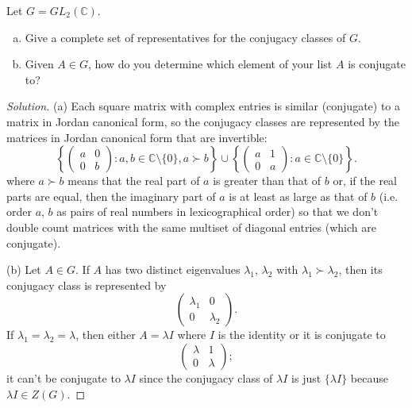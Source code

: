 \documentclass[10pt]{article}
\providecommand{\CC}{\mathbb C}
\providecommand{\ii}{\item}
\newenvironment{soln}{\begin{proof}[Solution]}{\end{proof}}
\begin{document}
\begin{problem}
    Let $G = GL_2(\CC)$.
    \begin{enumerate}[(a)]
        \ii Give a complete set of representatives for
	the conjugacy classes of $G$.
	\ii Given $A\in G$, how do you determine
	which element of your list $A$ is conjugate to?
    \end{enumerate}
\end{problem}

\begin{soln}
    (a) Each square matrix with complex entries
    is similar (conjugate) to a matrix in Jordan canonical form, so
    the conjugacy classes are represented by the matrices
    in Jordan canonical form that are invertible:
    \begin{equation*}
	\left\{ \begin{pmatrix}
		a&0\\0&b
	\end{pmatrix} : a,b\in\CC\setminus\{0\}, a\succ b\right\}\cup
	\left\{ \begin{pmatrix}
		a&1\\0&a
	\end{pmatrix} : a\in\CC\setminus\{0\}\right\}.
    \end{equation*}
    where $a\succ b$ means that the real part of $a$ is greater than that of $b$
    or, if the real parts are equal, then the imaginary part of $a$
    is at least as large as that of $b$ (i.e. order $a$, $b$
    as pairs of real numbers in lexicographical order)
    so that we don't double count matrices with the same multiset of
    diagonal entries (which are conjugate).

    (b) Let $A\in G$. If $A$ has two distinct eigenvalues $\lambda_1$, $\lambda_2$
    with $\lambda_1\succ\lambda_2$, then its conjugacy class is represented by
    \begin{equation*}
        \begin{pmatrix}
	    \lambda_1&0\\0&\lambda_2
        \end{pmatrix}.
    \end{equation*}
    If $\lambda_1=\lambda_2=\lambda$, then either $A = \lambda I$
    where $I$ is the identity or it is conjugate to
    \begin{equation*}
        \begin{pmatrix}
	    \lambda&1\\0&\lambda
        \end{pmatrix};
    \end{equation*}
    it can't be conjugate to $\lambda I$ since the conjugacy class
    of $\lambda I$ is just $\{\lambda I\}$ because $\lambda I\in Z(G)$.
\end{soln}
\end{document}
